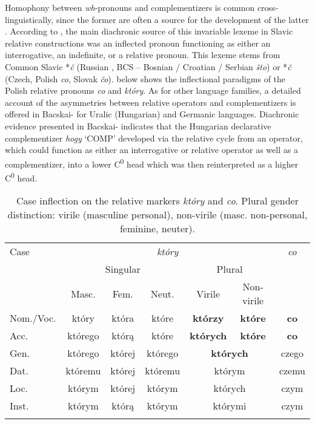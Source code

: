 \documentclass[output=paper]{langsci/langscibook}
\begin{document}
Homophony between \textit{wh}{}-pronouns and complementizers is common cross-linguistically, since the former are often a source for the development of the latter \citep[108]{Citko2004}. According to \citet{Minlos2012}, the main diachronic source of this invariable lexeme in Slavic relative constructions was an inflected pronoun functioning as either an interrogative, an indefinite, or a relative pronoun. This lexeme stems from Common Slavic *\textit{č }(Russian \textit{}, BCS – Bosnian / Croatian / Serbian \textit{što}) or *\textit{č }(Czech, Polish \textit{co}, Slovak \textit{čo}).  below shows the inflectional paradigms of the Polish relative pronouns \textit{co} and \textit{który}. As for other language families, a detailed account of the asymmetries between relative operators and complementizers is offered in Bacskai-\citet{Atkari2016} for Uralic (Hungarian) and Germanic languages. Diachronic evidence presented in Bacskai-\citet{Atkari2016} indicates that the Hungarian declarative complementizer \textit{hogy} ‘COMP’ developed via the relative cycle from an operator, which could function as either an interrogative or relative operator as well as a complementizer, into a lower C\textsuperscript{0} head which was then reinterpreted as a higher C\textsuperscript{0} head. 

\begin{table}
\caption{Case inflection on the relative markers \textit{który} and \textit{co}. Plural gender distinction: virile (masculine personal), non-virile (masc. non-personal, feminine, neuter).}
\begin{tabular}{l*{6}{c}}
\lsptoprule
Case & \multicolumn{5}{c}{\textit{który}} & \textit{co}\\
     & \multicolumn{3}{c}{Singular} & \multicolumn{2}{c}{Plural} & \\\cmidrule(lr){2-4}\cmidrule(lr){5-6}
     & Masc. & Fem. & Neut. & Virile & Non-virile & \\\midrule
Nom.\slash Voc. & który & która & które & \textbf{którzy} & \textbf{które} & \textbf{co}\\
Acc. & którego & którą & które & \textbf{których} & \textbf{które} & \textbf{co}\\
Gen. & którego & której & którego & \multicolumn{2}{c}{\textbf{których}} & czego\\
Dat. & któremu & której & któremu & \multicolumn{2}{c}{którym} & czemu\\
Loc. & którym & której & którym & \multicolumn{2}{c}{których} & czym\\
Inst. & którym & którą  & którym & \multicolumn{2}{c}{którymi} & czym\\
\lspbottomrule
\end{tabular}
\label{tab:leska:1}
\end{table}
\end{document}

